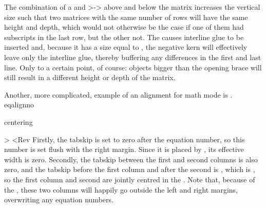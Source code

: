 The combination of a  and \ver>\kern-\baselineskip>
above and below the matrix increases the vertical size
such that two matrices with the same number of rows will have
the same height and depth, which would not otherwise be the case
if one of them had subscripts in the last row, but the other
not. The  causes interline glue to be inserted 
and, because it has a size equal to ,
the negative kern will effectively leave only the interline glue,
thereby buffering any differences in the first and last line.
Only to a certain point, of course: objects bigger than the
opening brace will still result in a different height or depth of the 
matrix.

Another, more
complicated, example of an alignment for math mode is .
\csterm eqalignno\par\csterm centering\par
\Ver>
\def\eqalignno#1{\displ@y \tabskip\centering
  \halign to\displaywidth{
    \hfil$\@lign\displaystyle{##}$%
        \tabskip\z@skip
    &$\@lign\displaystyle{{}##}$\hfil%
        \tabskip\centering
    &\llap{$\@lign##$}%
        \tabskip\z@skip\crcr   %
       #1\crcr}}<Rev
Firstly, the tabskip is set to zero after the equation
number, so this number is set flush with the right margin.
Since it is placed by , its effective width
is zero. Secondly, the tabskip between the
first and second columns is also zero, and the tabskip
before the first column and after the second  is
\alt
{}, which is ,
so the first column and second  are jointly centred
in the . Note that, because of the
, these two columns will happily go
outside the left and right margins, overwriting any
equation numbers.


\endinput
\spoint Error messages

\aftergroup in alignment?

